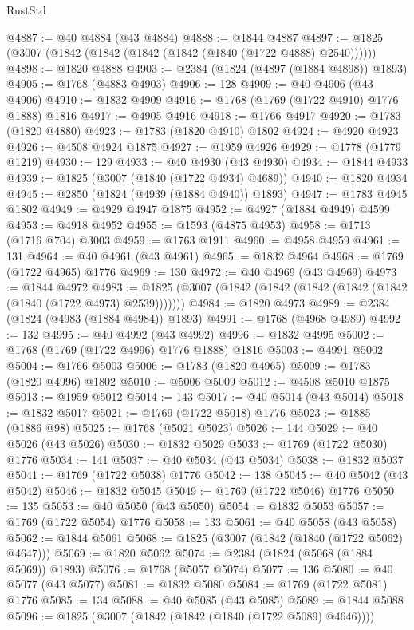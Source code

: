 \begin{lexlean}{RustStd}
\begin{coremodule}
{\begin{coremodule}
{{{{{{{{{{{{{{{{{{{{{{{{{{{{{{{{{{{{{{{{{{{{{{{@4887 := @40 @4884 (@43 @4884)
@4888 := @1844 @4887
@4897 := @1825 (@3007 (@1842 (@1842 (@1842 (@1842 (@1840 (@1722 @4888) @2540))))))
@4898 := @1820 @4888
@4903 := @2384 (@1824 (@4897 (@1884 @4898)) @1893)
@4905 := @1768 (@4883 @4903)
@4906 := 128
@4909 := @40 @4906 (@43 @4906)
@4910 := @1832 @4909
@4916 := @1768 (@1769 (@1722 @4910) @1776 @1888) @1816
@4917 := @4905 @4916
@4918 := @1766 @4917
@4920 := @1783 (@1820 @4880)
@4923 := @1783 (@1820 @4910) @1802
@4924 := @4920 @4923
@4926 := @4508 @4924 @1875
@4927 := @1959 @4926
@4929 := @1778 (@1779 @1219)
@4930 := 129
@4933 := @40 @4930 (@43 @4930)
@4934 := @1844 @4933
@4939 := @1825 (@3007 (@1840 (@1722 @4934) @4689))
@4940 := @1820 @4934
@4945 := @2850 (@1824 (@4939 (@1884 @4940)) @1893)
@4947 := @1783 @4945 @1802
@4949 := @4929 @4947 @1875
@4952 := @4927 (@1884 @4949) @4599
@4953 := @4918 @4952
@4955 := @1593 (@4875 @4953)
@4958 := @1713 (@1716 @704) @3003
@4959 := @1763 @1911
@4960 := @4958 @4959
@4961 := 131
@4964 := @40 @4961 (@43 @4961)
@4965 := @1832 @4964
@4968 := @1769 (@1722 @4965) @1776
@4969 := 130
@4972 := @40 @4969 (@43 @4969)
@4973 := @1844 @4972
@4983 := @1825 (@3007 (@1842 (@1842 (@1842 (@1842 (@1842 (@1840 (@1722 @4973) @2539)))))))
@4984 := @1820 @4973
@4989 := @2384 (@1824 (@4983 (@1884 @4984)) @1893)
@4991 := @1768 (@4968 @4989)
@4992 := 132
@4995 := @40 @4992 (@43 @4992)
@4996 := @1832 @4995
@5002 := @1768 (@1769 (@1722 @4996) @1776 @1888) @1816
@5003 := @4991 @5002
@5004 := @1766 @5003
@5006 := @1783 (@1820 @4965)
@5009 := @1783 (@1820 @4996) @1802
@5010 := @5006 @5009
@5012 := @4508 @5010 @1875
@5013 := @1959 @5012
@5014 := 143
@5017 := @40 @5014 (@43 @5014)
@5018 := @1832 @5017
@5021 := @1769 (@1722 @5018) @1776
@5023 := @1885 (@1886 @98)
@5025 := @1768 (@5021 @5023)
@5026 := 144
@5029 := @40 @5026 (@43 @5026)
@5030 := @1832 @5029
@5033 := @1769 (@1722 @5030) @1776
@5034 := 141
@5037 := @40 @5034 (@43 @5034)
@5038 := @1832 @5037
@5041 := @1769 (@1722 @5038) @1776
@5042 := 138
@5045 := @40 @5042 (@43 @5042)
@5046 := @1832 @5045
@5049 := @1769 (@1722 @5046) @1776
@5050 := 135
@5053 := @40 @5050 (@43 @5050)
@5054 := @1832 @5053
@5057 := @1769 (@1722 @5054) @1776
@5058 := 133
@5061 := @40 @5058 (@43 @5058)
@5062 := @1844 @5061
@5068 := @1825 (@3007 (@1842 (@1840 (@1722 @5062) @4647)))
@5069 := @1820 @5062
@5074 := @2384 (@1824 (@5068 (@1884 @5069)) @1893)
@5076 := @1768 (@5057 @5074)
@5077 := 136
@5080 := @40 @5077 (@43 @5077)
@5081 := @1832 @5080
@5084 := @1769 (@1722 @5081) @1776
@5085 := 134
@5088 := @40 @5085 (@43 @5085)
@5089 := @1844 @5088
@5096 := @1825 (@3007 (@1842 (@1842 (@1840 (@1722 @5089) @4646))))
}}}}}}}}}}}}}}}}}}}}}}}}}}}}}}}}}}}}}}}}}}}}}}}
\end{coremodule}}
\end{coremodule}
\end{lexlean}
